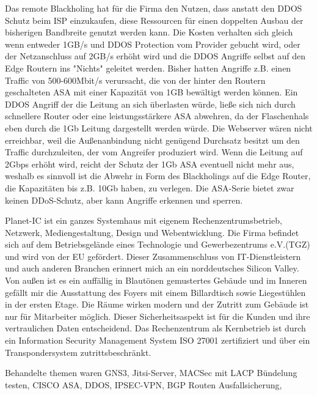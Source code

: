 \documentclass[english,runningheads,a4paper]{llncs}[2018/03/10]
\newcommand{\commentontext}[2]{\colorbox{yellow!60}{#1}\pdfcomment[color={0.234 0.867 0.211},hoffset=-6pt,voffset=10pt,opacity=0.5]{#2}}
\begin{document}
Das remote Blackholing hat für die Firma den Nutzen, dass anstatt den DDOS Schutz beim ISP einzukaufen, diese Ressourcen für einen doppelten Ausbau der bisherigen Bandbreite genutzt werden kann. Die Kosten verhalten sich gleich wenn entweder  1GB/s und DDOS Protection vom Provider gebucht wird, oder der Netzanschluss auf 2GB/s erhöht wird und die DDOS Angriffe selbst auf den Edge Routern ins "Nichts" geleitet werden. Bisher hatten Angriffe z.B. einen Traffic von 500-600Mbit/s verursacht, die von der hinter den Routern geschalteten ASA mit einer Kapazität von 1GB bewältigt werden können. Ein DDOS Angriff der die Leitung an sich überlasten würde, ließe sich nich durch schnellere Router oder eine leistungsstärkere ASA abwehren, da der Flaschenhals eben durch die 1Gb Leitung dargestellt werden würde. Die Webserver wären nicht erreichbar, weil die Außenanbindung  nicht genügend Durchsatz besitzt um den Traffic durchzuleiten, der vom Angreifer produziert wird. Wenn die Leitung auf 2Gbps erhöht wird, reicht der Schutz der 1Gb ASA eventuell nicht mehr aus, weshalb es sinnvoll ist die Abwehr in Form des Blackholings auf die Edge Router, die Kapazitäten bis z.B. 10Gb haben, zu verlegen. Die ASA-Serie bietet zwar keinen DDoS-Schutz, aber kann Angriffe erkennen und sperren.

Planet-IC ist ein ganzes Systemhaus mit eigenem Rechenzentrumsbetrieb, Netzwerk, Mediengestaltung, Design und Webentwicklung. Die Firma befindet sich auf dem Betriebsgelände eines Technologie und Gewerbezentrums e.V.(TGZ) und wird von der \commentontext{EU gefördert}{stimmt das?}. Dieser Zusammenschluss von IT-Dienstleistern und auch anderen Branchen erinnert mich an ein norddeutsches Silicon Valley.
Von außen ist es ein auffällig in Blautönen gemustertes Gebäude und im Inneren gefällt mir die Ausstattung des Foyers mit einem Billardtisch sowie Liegestühlen in der ersten Etage. Die Räume wirken modern und der Zutritt zum Gebäude ist nur für Mitarbeiter möglich. Dieser Sicherheitsaspekt ist für die Kunden und ihre vertraulichen Daten entscheidend.
Das Rechenzentrum als Kernbetrieb ist durch ein Information Security Management System ISO 27001 zertifiziert und über ein Transpondersystem zutrittsbeschränkt. 

Behandelte themen waren GNS3, Jitsi-Server, MACSec mit LACP Bündelung testen, CISCO ASA, DDOS, IPSEC-VPN, BGP Routen Ausfallsicherung,
\end{document}

